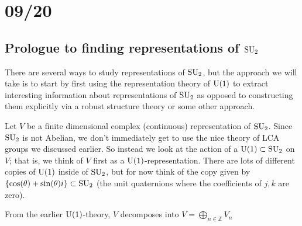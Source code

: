 \documentclass[../../rtnotes.tex]{subfiles}
\begin{document}
\section{09/20}
\subsection{Prologue to finding representations of $\operatorname{SU}_2$}
There are several ways to study representations of $\operatorname{SU}_2$, but the approach we will take is to start by first using the representation theory of $\operatorname{U}(1)$ to extract interesting information about representations of $\operatorname{SU}_2$ as opposed to constructing them explicitly via a robust structure theory or some other approach.

Let $V$ be a finite dimensional complex (continuous) representation of $\operatorname{SU}_2$. Since $\operatorname{SU}_2$ is not Abelian, we don't immediately get to use the nice theory of LCA groups we discussed earlier. So instead we look at the action of a $\operatorname{U}(1)\subset \operatorname{SU}_2$ on $V$; that is, we think of $V$ first as a $\operatorname{U}(1)$-representation. There are lots of different copies of $\operatorname{U}(1)$ inside of $\operatorname{SU}_2$, but for now think of the copy given by $\{\cos(\theta) + \sin(\theta)i\}\subset \operatorname{SU}_2$ (the unit quaternions where the coefficients of $j,k$ are zero).

From the earlier $\operatorname{U}(1)$-theory, $V$ decomposes into  $V = \bigoplus_{n\in\mathbb Z}V_n$
\end{document}
